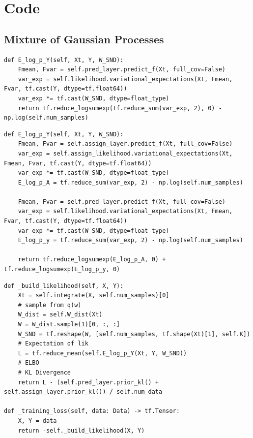 \documentclass[12pt,a4paper]{report}
\theoremstyle{definition}
\begin{document}
\chapter{Code}

\section{Mixture of Gaussian Processes}

\begin{lstlisting}[label=code:SMGPElogpY,  caption={E\_log\_p\_Y for the original SMGP using \citet{Lui2021} lowerbound}]
def E_log_p_Y(self, Xt, Y, W_SND):
    Fmean, Fvar = self.pred_layer.predict_f(Xt, full_cov=False)
    var_exp = self.likelihood.variational_expectations(Xt, Fmean, Fvar, tf.cast(Y, dtype=tf.float64))
    var_exp *= tf.cast(W_SND, dtype=float_type)
    return tf.reduce_logsumexp(tf.reduce_sum(var_exp, 2), 0) - np.log(self.num_samples)
\end{lstlisting}

\begin{lstlisting}[label=code:SMGPModifiedElogpY,  caption={E\_log\_p\_Y for the modified SMGP using \citet{Kaiser2020} lowerbound}]
def E_log_p_Y(self, Xt, Y, W_SND):
    Fmean, Fvar = self.assign_layer.predict_f(Xt, full_cov=False)
    var_exp = self.assign_likelihood.variational_expectations(Xt, Fmean, Fvar, tf.cast(Y, dtype=tf.float64))
    var_exp *= tf.cast(W_SND, dtype=float_type)
    E_log_p_A = tf.reduce_sum(var_exp, 2) - np.log(self.num_samples)

    Fmean, Fvar = self.pred_layer.predict_f(Xt, full_cov=False)
    var_exp = self.likelihood.variational_expectations(Xt, Fmean, Fvar, tf.cast(Y, dtype=tf.float64))
    var_exp *= tf.cast(W_SND, dtype=float_type)
    E_log_p_y = tf.reduce_sum(var_exp, 2) - np.log(self.num_samples)

    return tf.reduce_logsumexp(E_log_p_A, 0) + tf.reduce_logsumexp(E_log_p_y, 0)
\end{lstlisting}

\begin{lstlisting}[label=code:SMGPLikelihood,  caption={Likelihood for the modified SMGP}]
def _build_likelihood(self, X, Y):
    Xt = self.integrate(X, self.num_samples)[0]
    # sample from q(w)
    W_dist = self.W_dist(Xt)
    W = W_dist.sample(1)[0, :, :]
    W_SND = tf.reshape(W, [self.num_samples, tf.shape(Xt)[1], self.K])
    # Expectation of lik
    L = tf.reduce_mean(self.E_log_p_Y(Xt, Y, W_SND))
    # ELBO
    # KL Divergence
    return L - (self.pred_layer.prior_kl() + self.assign_layer.prior_kl()) / self.num_data

def _training_loss(self, data: Data) -> tf.Tensor:
    X, Y = data
    return -self._build_likelihood(X, Y)
\end{lstlisting}
\end{document}
